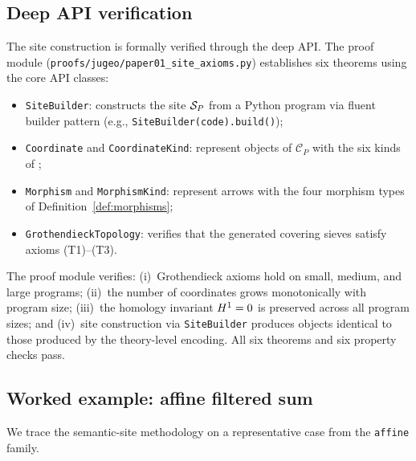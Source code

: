 \documentclass[11pt]{article}
\begin{document}
\subsection{Deep API verification}\label{ssec:deep-api}

The site construction is formally verified through the \JuGeo{} deep API.
The proof module (\texttt{proofs/jugeo/paper01\_site\_axioms.py}) establishes
six theorems using the core API classes:

\begin{itemize}[nosep]
  \item \texttt{SiteBuilder}: constructs the site $\mathcal{S}_P$ from a Python
        program via fluent builder pattern (e.g.,
        \texttt{SiteBuilder(code).build()});
  \item \texttt{Coordinate} and \texttt{CoordinateKind}: represent objects
        of $\mathcal{C}_P$ with the six kinds of
        ;
  \item \texttt{Morphism} and \texttt{MorphismKind}: represent arrows with
        the four morphism types of Definition~\ref{def:morphisms};
  \item \texttt{GrothendieckTopology}: verifies that the generated covering
        sieves satisfy axioms (T1)--(T3).
\end{itemize}

The proof module verifies: (i)~Grothendieck axioms hold on small, medium,
and large programs; (ii)~the number of coordinates grows monotonically
with program size; (iii)~the homology invariant $H^{1} = 0$ is preserved
across all program sizes; and (iv)~site construction via
\texttt{SiteBuilder} produces objects identical to those produced by the
theory-level encoding.  All six theorems and six property checks pass.

\subsection{Worked example: affine filtered sum}

We trace the semantic-site methodology on a representative case from the
\texttt{affine} family.
\end{document}

